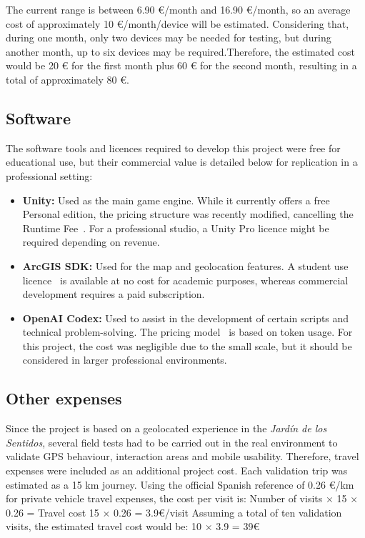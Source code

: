 The current range is between 6.90 €/month and 16.90 €/month, so an average cost of approximately 10 €/month/device will be estimated. Considering that, during one month, only two devices may be needed for testing, but during another month, up to six devices may be required.Therefore, the estimated cost would be 20 € for the first month plus 60 € for the second month, resulting in a total of approximately 80 €.


\subsection{Software}
The software tools and licences required to develop this project were free for educational use, but their commercial value is detailed below for replication in a professional setting:
\begin{itemize}
    \item \textbf{Unity:} Used as the main game engine. While it currently offers a free Personal edition, the pricing structure was recently modified, cancelling the Runtime Fee~\cite{unity_pricing}. For a professional studio, a Unity Pro licence might be required depending on revenue.
    \item \textbf{ArcGIS SDK:} Used for the map and geolocation features. A student use licence~\cite{arcgis_license} is available at no cost for academic purposes, whereas commercial development requires a paid subscription.
    \item \textbf{OpenAI Codex:} Used to assist in the development of certain scripts and technical problem-solving. The pricing model~\cite{codex_pricing} is based on token usage. For this project, the cost was negligible due to the small scale, but it should be considered in larger professional environments.
\end{itemize}
\subsection{Other expenses}
Since the project is based on a geolocated experience in the \textit{Jardín de los Sentidos}, several field tests had to be carried out in the real environment to validate GPS behaviour, interaction areas and mobile usability. Therefore, travel expenses were included as an additional project cost.
Each validation trip was estimated as a 15 km journey. Using the official Spanish reference of 0.26 €/km for private vehicle travel expenses, the cost per visit is:
Number of visits × 15 × 0.26 = Travel cost      
15 × 0.26 = 3.9€/visit
Assuming a total of  ten validation visits, the estimated travel cost would be:
10 × 3.9 =  39€

